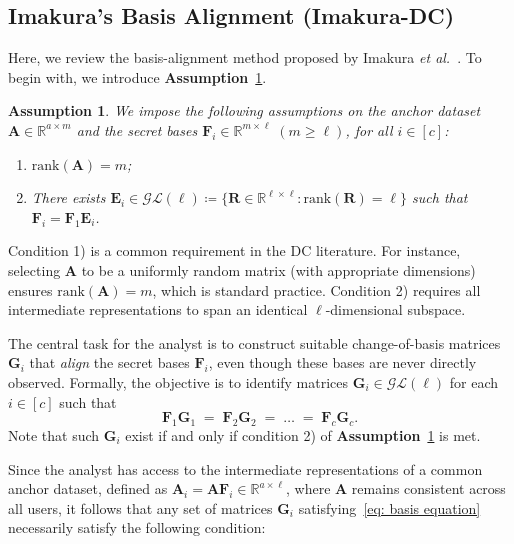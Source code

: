 \documentclass[final,3p,times]{elsarticle}
\theoremstyle{plain}
\newtheorem{assumption}[theorem]{Assumption}
\newcommand{\matr}[1]{\bm{#1}}        %
\begin{document}
\subsection{Imakura's Basis Alignment (Imakura-DC)}
\label{subsection: Imakura}

Here, we review the basis-alignment method proposed by Imakura \textit{et al.}~\cite{DCprivacy}. To begin with, we introduce \textbf{Assumption}~\ref{assumptions: DC}.

\begin{assumption}
    \label{assumptions: DC}
    We impose the following assumptions on the anchor dataset \( \matr{A} \in \mathbb{R}^{a \times m} \) and the secret bases \( \matr{F}_i \in \mathbb{R}^{m \times \ell} \; (m \geq \ell) \), for all \(i \in [c]\):
    \begin{enumerate}[label=\arabic*)]
        \item \( \mathrm{rank}(\matr{A}) = m \);
        \item There exists \( \matr{E}_i \in \mathcal{GL}(\ell) \coloneqq \{ \matr{R} \in \mathbb{R}^{\ell \times \ell} : \mathrm{rank}(\matr{R}) = \ell \}  \) such that \( \matr{F}_i = \matr{F}_1\matr{E}_i \).
    \end{enumerate}
\end{assumption}

Condition 1) is a common requirement in the DC literature. For instance, selecting \( \matr{A} \)  to be a uniformly random matrix (with appropriate dimensions) ensures \(\mathrm{rank}(\matr{A}) = m\), which is standard practice. Condition 2) requires all intermediate representations to span an identical \(\ell\)-dimensional subspace. 

The central task for the analyst is to construct suitable change-of-basis matrices \( \matr{G}_i \) that \emph{align} the secret bases \( \matr{F}_i \), even though these bases are never directly observed. Formally, the objective is to identify matrices \( \matr{G}_i \in \mathcal{GL}(\ell) \) for each \( i \in [c] \) such that
\begin{equation}
    \label{eq: basis equation}
    \matr{F}_1 \matr{G}_1 \;=\; \matr{F}_2 \matr{G}_2 \;=\; \dots \;=\; \matr{F}_c \matr{G}_c.
\end{equation}
Note that such $\matr{G}_i$ exist if and only if condition 2) of \textbf{Assumption}~\ref{assumptions: DC} is met.

Since the analyst has access to the intermediate representations of a common anchor dataset, defined as \(\matr{A}_i = \matr{A}\matr{F}_i \in \mathbb{R}^{a\times \ell}\), where \(\matr{A}\) remains consistent across all users, it follows that any set of matrices \(\matr{G}_i\) satisfying~\eqref{eq: basis equation} necessarily satisfy the following condition:
\end{document}
